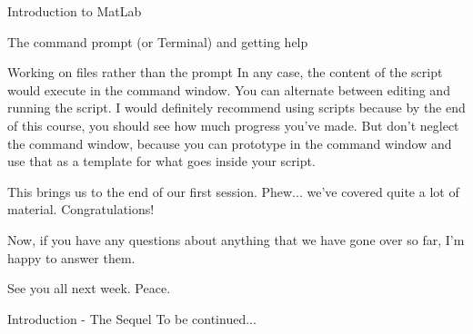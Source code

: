 \documentclass[11pt, oneside]{report}   	%
\begin{document}
\begin{chapter}{Introduction to MatLab}
\begin{section}{The command prompt (or Terminal) and getting help}
\begin{subsection}{Working on files rather than the prompt}
In any case, the content of the script would execute in the command window. You can alternate between editing and running the script. I would definitely recommend using scripts because by the end of this course, you should see how much progress you've made. But don't neglect the command window, because you can prototype in the command window and use that as a template for what goes inside your script.
\end{subsection}

This brings us to the end of our first session. Phew... we've covered quite a lot of material. Congratulations!

Now, if you have any questions about anything that we have gone over so far, I'm happy to answer them.

See you all next week. Peace.

\end{section}
\end{chapter}

\begin{chapter}{Introduction - The Sequel}
To be continued...

\end{chapter}
\end{document}
